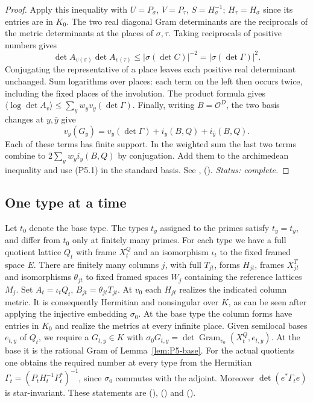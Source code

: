 \begin{proof}
Apply this inequality with $U=P_\sigma$, $V=P_\tau$, $S=H_\sigma^{-1}$;
$H_\tau=H_\sigma$ since its entries are in $K_0$. The two real diagonal
Gram determinants are the reciprocals of the metric determinants at the
places of $\sigma,\tau$. Taking reciprocals of positive numbers gives
\[
  \det A_{v(\sigma)}\det A_{v(\tau)}
        \le |\sigma(\det C)|^{-2}=|\sigma(\det\Gamma)|^2 .
\]
Conjugating the representative of a place leaves each positive real
determinant unchanged. Sum logarithms over places: each term on the left
then occurs twice, including the fixed places of the involution.
The product formula gives
$\langle\log\det A_v\rangle\le\sum_y w_yv_y(\det\Gamma)$.
Finally, writing $B=\mathcal O^D$, the two basis changes at $y,\bar y$ give
\[
 v_y(G_y)=v_y(\det\Gamma)+ i_y(B,Q)+i_{\bar y}(B,Q).
\]
Each of these terms has finite support. In the weighted sum the last two
terms combine to $2\sum_yw_y i_y(B,Q)$ by conjugation. Add them to the
archimedean inequality and use (P5.1) in the standard basis.
See , 
().
\emph{Status: complete.}
\end{proof}

\subsection{One type at a time}
Let $t_0$ denote the base type. The types $t_y$ assigned to the primes
satisfy $t_{\bar y}=t_y$, and differ from $t_0$ only at finitely many
primes. For each type we have a full quotient lattice $Q_t$ with frame
$X^Q_t$ and an isomorphism $\iota_t$ to the fixed framed space $E$.
There are finitely many columns $j$, with full $T_{jt}$, forms $H_{jt}$,
frames $X^T_{jt}$ and isomorphisms $\theta_{jt}$ to fixed framed spaces
$W_j$ containing the reference lattices $M_j$. Set
$A_t=\iota_t Q_t$, $B_{jt}=\theta_{jt}T_{jt}$. At $v_0$ each $H_{jt}$
realizes the indicated column metric. It is consequently Hermitian and
nonsingular over $K$, as can be seen after applying the injective embedding
$\sigma_0$. At the base type the column forms have entries in $K_0$ and
realize the metrics at every infinite place. Given semilocal bases $e_{t,y}$
of $Q_t$, we require a $G_{t,y}\in K$ with
$\sigma_0 G_{t,y}=\det\operatorname{Gram}_{v_0}(X^Q_t,e_{t,y})$.
At the base it is the rational Gram of Lemma~\ref{lem:P5-base}.
For the actual quotients one obtains the required number at every type
from the Hermitian $\Gamma_t=(P_tH_t^{-1}P_t^*)^{-1}$, since $\sigma_0$
commutes with the adjoint. Moreover $\det(e^*\Gamma_t e)$ is star-invariant.
These statements are  (),
() and 
().

